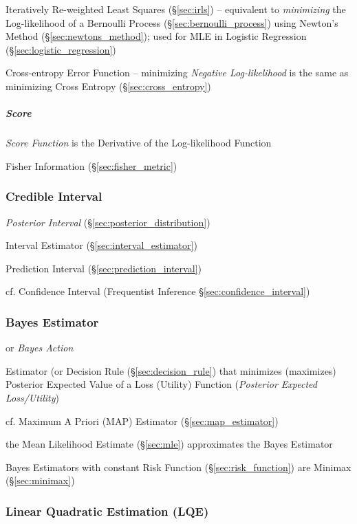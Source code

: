 Iteratively Re-weighted Least Squares (\S\ref{sec:irls}) -- equivalent to
\emph{minimizing} the Log-likelihood of a Bernoulli Process
(\S\ref{sec:bernoulli_process}) using Newton's Method
(\S\ref{sec:newtons_method}); used for MLE in Logistic Regression
(\S\ref{sec:logistic_regression})

\fist Cross-entropy Error Function -- minimizing \emph{Negative Log-likelihood}
is the same as minimizing Cross Entropy (\S\ref{sec:cross_entropy})



\subparagraph{Score}\label{sec:score}\hfill

\emph{Score Function} is the Derivative of the Log-likelihood Function

\fist Fisher Information (\S\ref{sec:fisher_metric})



\subsubsection{Credible Interval}\label{sec:credible_interval}

\emph{Posterior Interval} (\S\ref{sec:posterior_distribution})

Interval Estimator (\S\ref{sec:interval_estimator})

Prediction Interval (\S\ref{sec:prediction_interval})

cf. Confidence Interval (Frequentist Inference \S\ref{sec:confidence_interval})



\subsubsection{Bayes Estimator}\label{sec:bayes_estimator}\hfill

or \emph{Bayes Action}

Estimator (or Decision Rule (\S\ref{sec:decision_rule}) that minimizes
(maximizes) Posterior Expected Value of a Loss (Utility) Function
(\emph{Posterior Expected Loss/Utility})

cf. Maximum A Priori (MAP) Estimator (\S\ref{sec:map_estimator})

the Mean Likelihood Estimate (\S\ref{sec:mle}) approximates the Bayes Estimator

Bayes Estimators with constant Risk Function (\S\ref{sec:risk_function}) are
Minimax (\S\ref{sec:minimax})



\subsubsection{Linear Quadratic Estimation (LQE)}\label{sec:lqe}

